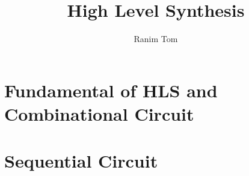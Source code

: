 \documentclass[12pt,a4paper]{book}
\title{High Level Synthesis}
\author{Ranim Tom}
\begin{document}
\maketitle

\tableofcontents

\listoffigures

\listoftables


\printnomenclature


\listoftodos


\pagestyle{fancy}
\fancyhf{} %
\rhead{\rightmark}

\part{Fundamental of HLS and Combinational Circuit}
\label{part:fundamentals}












\part{Sequential Circuit}
\label{part:sequential}




\end{document}
